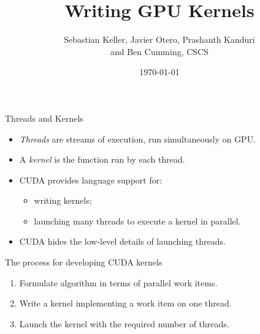 \documentclass[aspectratio=43]{beamer}
\author{Sebastian Keller, Javier Otero, Prashanth Kanduri\\ and Ben Cumming, CSCS}
\title{Writing GPU Kernels}
\subtitle{}
\date{\today}
\begin{document}
\cscstitle


\begin{frame}[fragile]{Threads and Kernels}
    \begin{itemize}
        \item \emph{Threads} are streams of execution, run simultaneously on GPU.
        \item A \emph{kernel} is the function run by each thread.
        \item CUDA provides language support for:
        \begin{itemize}
            \item writing kernels;
            \item launching many threads to execute a kernel in parallel.
        \end{itemize}
        \item CUDA hides the low-level details of launching threads.
    \end{itemize}

    \begin{info}{The process for developing CUDA kernels}
        \begin{enumerate}
            \item Formulate algorithm in terms of parallel work items.
            \item Write a kernel implementing a work item on one thread.
            \item Launch the kernel with the required number of threads.
        \end{enumerate}
    \end{info}
\end{frame}
\end{document}
